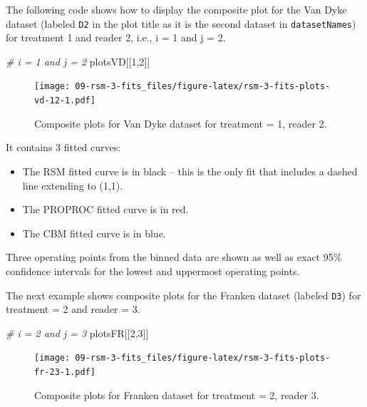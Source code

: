 \documentclass[
]{book}
\newenvironment{Shaded}{\begin{snugshade}}{\end{snugshade}}
\newcommand{\CommentTok}[1]{\textcolor[rgb]{0.56,0.35,0.01}{\textit{#1}}}
\newcommand{\DecValTok}[1]{\textcolor[rgb]{0.00,0.00,0.81}{#1}}
\newcommand{\NormalTok}[1]{#1}
\providecommand{\tightlist}{%
  \setlength{\itemsep}{0pt}\setlength{\parskip}{0pt}}
\begin{document}
The following code shows how to display the composite plot for the Van Dyke dataset (labeled \texttt{D2} in the plot title as it is the second dataset in \texttt{datasetNames}) for treatment 1 and reader 2, i.e., i = 1 and j = 2.

\begin{Shaded}
\begin{Highlighting}[]
\CommentTok{\# i = 1 and j = 2 }
\NormalTok{plotsVD[[}\DecValTok{1}\NormalTok{,}\DecValTok{2}\NormalTok{]]}
\end{Highlighting}
\end{Shaded}

\begin{figure}
\centering
\texttt{[image: 09-rsm-3-fits\_files/figure-latex/rsm-3-fits-plots-vd-12-1.pdf]}
\caption{\label{fig:rsm-3-fits-plots-vd-12}Composite plots for Van Dyke dataset for treatment = 1, reader 2.}
\end{figure}

It contains 3 fitted curves:

\begin{itemize}
\tightlist
\item
  The RSM fitted curve is in black -- this is the only fit that includes a dashed line extending to (1,1).
\item
  The PROPROC fitted curve is in red.
\item
  The CBM fitted curve is in blue.
\end{itemize}

Three operating points from the binned data are shown as well as exact 95\% confidence intervals for the lowest and uppermost operating points.

The next example shows composite plots for the Franken dataset (labeled \texttt{D3}) for treatment = 2 and reader = 3.

\begin{Shaded}
\begin{Highlighting}[]
\CommentTok{\# i = 2 and j = 3 }
\NormalTok{plotsFR[[}\DecValTok{2}\NormalTok{,}\DecValTok{3}\NormalTok{]]}
\end{Highlighting}
\end{Shaded}

\begin{figure}
\centering
\texttt{[image: 09-rsm-3-fits\_files/figure-latex/rsm-3-fits-plots-fr-23-1.pdf]}
\caption{\label{fig:rsm-3-fits-plots-fr-23}Composite plots for Franken dataset for treatment = 2, reader 3.}
\end{figure}
\end{document}
